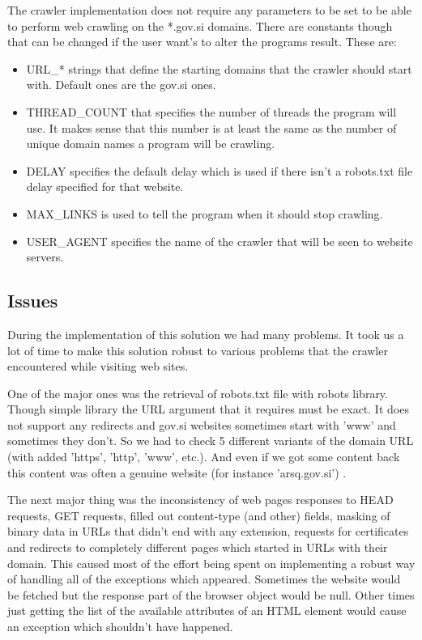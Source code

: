 \documentclass[9pt]{IEEEtran}
\begin{document}
The crawler implementation does not require any parameters to be set to be able to perform web crawling on the *.gov.si domains.
There are constants though that can be changed if the user want's to alter the programs result.
These are:
\begin{itemize}
\item{URL\_* strings that define the starting domains that the crawler should start with. Default ones are the gov.si ones.}
\item{THREAD\_COUNT that specifies the number of threads the program will use. It makes sense that this number is at least the same as the number of unique domain names a program will be crawling.}
\item{DELAY specifies the default delay which is used if there isn't a robots.txt file delay specified for that website.}
\item{MAX\_LINKS is used to tell the program when it should stop crawling.}
\item{USER\_AGENT specifies the name of the crawler that will be seen to website servers.}
\end{itemize}

\subsection{Issues}
During the implementation of this solution we had many problems.
It took us a lot of time to make this solution robust to various problems that the crawler encountered while visiting web sites.

One of the major ones was the retrieval of robots.txt file with robots library. 
Though simple library the URL argument that it requires must be exact.
It does not support any redirects and gov.si websites sometimes start with 'www' and sometimes they don't. 
So we had to check 5 different variants of the domain URL (with added 'https', 'http', 'www', etc.).
And even if we got some content back this content was often a genuine website (for instance 'arsq.gov.si') .

The next major thing was the inconsistency of web pages responses to HEAD requests, GET requests, filled out content-type (and other) fields, masking of binary data in URLs that didn't end with any extension, requests for certificates and redirects to completely different pages which started in URLs with their domain.
This caused most of the effort being spent on implementing a robust way of handling all of the exceptions which appeared. 
Sometimes the website would be fetched but the response part of the browser object would be null.
Other times just getting the list of the available attributes of an HTML element would cause an exception which shouldn't have happened.
\end{document}
